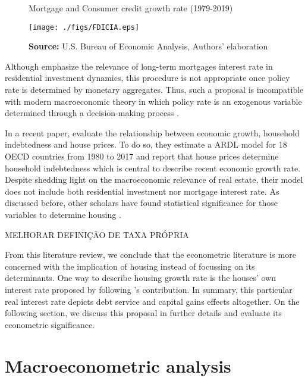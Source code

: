 \documentclass[12pt, a4]{article}
\begin{document}
\begin{figure}[htb]
	\centering
	\caption{Mortgage and Consumer credit growth rate (1979-2019)}
	\label{Fig:CreditFDICIA}
	\texttt{[image: ./figs/FDICIA.eps]}
	\caption*{\textbf{Source:} U.S. Bureau of Economic Analysis, Authors' elaboration}
\end{figure}

Although \textcite{gauger_residential_2003} emphasize the relevance of long-term mortgages interest rate in residential investment dynamics, this procedure is not appropriate once policy rate is determined by monetary aggregates.
Thus, such a proposal is incompatible with modern macroeconomic theory in which policy rate is an exogenous variable determined through a decision-making process \cite[p.~230--256]{lavoie_post-keynesian_2015}.

In a recent paper, \textcite{wood_house_2020} evaluate the relationship between economic growth, household indebtedness and house prices.
To do so, they estimate a ARDL model for 18 OECD countries from 1980 to 2017 and report that house prices determine household indebtedness which is central to describe recent economic growth rate.
Despite shedding light on the macroeconomic relevance of real estate, their model does not include both residential investment nor mortgage interest rate.
As discussed before, other scholars have found statistical significance for those variables to determine housing \cite{gauger_residential_2003}.



MELHORAR DEFINIÇÃO DE TAXA PRÓPRIA

From this literature review, we conclude that the econometric literature is more concerned with the implication of housing instead of focussing on its determinants.
One way to describe housing growth rate is the houses' own interest rate proposed by \textcite{teixeira_crescimento_2015} following 's \citeyear{sraffadrhayekmoney1932} contribution.
In summary, this particular real interest rate depicts debt service and capital gains effects altogether.
On the following section, we discuss this proposal in further details and evaluate its econometric significance.



\section{Macroeconometric analysis}
\label{sec:org3e0c9c5}
\label{sec:VECM}
\end{document}

